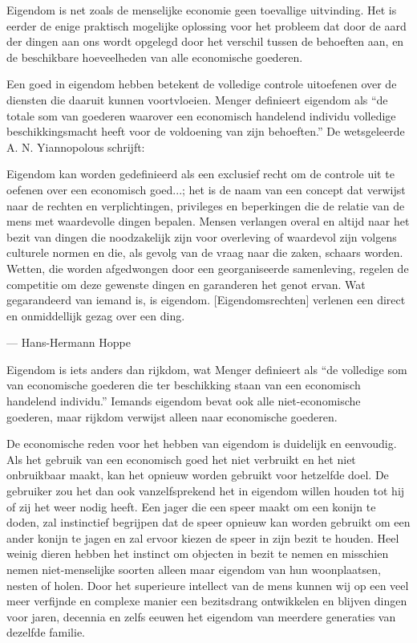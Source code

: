 \begin{blockquotebox}
    Eigendom is net zoals de menselijke economie geen toevallige uitvinding. Het is eerder de enige praktisch mogelijke oplossing voor het probleem dat door de aard der dingen aan ons wordt opgelegd door het verschil tussen de behoeften aan, en de beschikbare hoeveelheden van alle economische goederen.\footnotemark
\end{blockquotebox}
\autocite{48}


Een goed in eigendom hebben betekent de volledige controle uitoefenen over de diensten die daaruit kunnen voortvloeien. Menger definieert eigendom als \enquote{de totale som van goederen waarover een economisch handelend individu volledige beschikkingsmacht heeft voor de voldoening van zijn behoeften.}\autocite{49} De wetsgeleerde A. N. Yiannopolous schrijft:

\begin{blockquotebox}
    Eigendom kan worden gedefinieerd als een exclusief recht om de controle uit te oefenen over een economisch goed...; het is de naam van een concept dat verwijst naar de rechten en verplichtingen, privileges en beperkingen die de relatie van de mens met waardevolle dingen bepalen. Mensen verlangen overal en altijd naar het bezit van dingen die noodzakelijk zijn voor overleving of waardevol zijn volgens culturele normen en die, als gevolg van de vraag naar die zaken, schaars worden. Wetten, die worden afgedwongen door een georganiseerde samenleving, regelen de competitie om deze gewenste dingen en garanderen het genot ervan. Wat gegarandeerd van iemand is, is eigendom. [Eigendomsrechten] verlenen een direct en onmiddellijk gezag over een ding.\footnotemark
    \par\raggedleft--- Hans-Hermann Hoppe
\end{blockquotebox}
\autocite{50}

Eigendom is iets anders dan rijkdom, wat Menger definieert als \enquote{de volledige som van economische goederen die ter beschikking staan van een economisch handelend individu.} \autocite{51} Iemands eigendom bevat ook alle niet-economische goederen, maar rijkdom verwijst alleen naar economische goederen.

De economische reden voor het hebben van eigendom is duidelijk en eenvoudig. Als het gebruik van een economisch goed het niet verbruikt en het niet onbruikbaar maakt, kan het opnieuw worden gebruikt voor hetzelfde doel. De gebruiker zou het dan ook vanzelfsprekend het in eigendom willen houden tot hij of zij het weer nodig heeft. Een jager die een speer maakt om een konijn te doden, zal instinctief begrijpen dat de speer opnieuw kan worden gebruikt om een ander konijn te jagen en zal ervoor kiezen de speer in zijn bezit te houden. Heel weinig dieren hebben het instinct om objecten in bezit te nemen en misschien nemen niet-menselijke soorten alleen maar eigendom van hun woonplaatsen, nesten of holen. Door het superieure intellect van de mens kunnen wij op een veel meer verfijnde en complexe manier een bezitsdrang ontwikkelen en blijven dingen voor jaren, decennia en zelfs eeuwen het eigendom van meerdere generaties van dezelfde familie.

